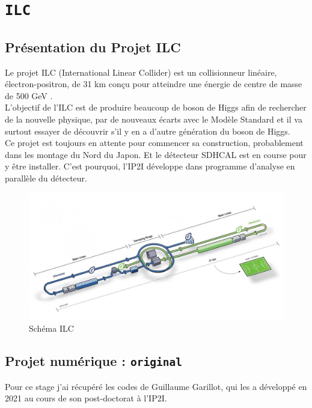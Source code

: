 \documentclass[10pt,a4paper]{report}
\newcommand{\MS}{Modèle Standard\xspace}
\newcommand{\original}{\texttt{original}\xspace}
\begin{document}

\chapter{\texttt{ILC}}

\section{Présentation du Projet ILC}

Le projet ILC (International Linear Collider) est un collisionneur linéaire, électron-positron, de 31 km conçu pour atteindre une énergie de centre de masse de 500 GeV \cite{cern:ilc}. \\

L'objectif de l'ILC est de produire beaucoup de boson de Higgs afin de rechercher de la nouvelle physique, par de nouveaux écarts avec le \MS et il va surtout essayer de découvrir s'il y en a d'autre génération du boson de Higgs. \\

Ce projet est toujours en attente pour commencer sa construction, probablement dans les montage du Nord du Japon. Et le détecteur SDHCAL est en course pour y être installer. C'est pourquoi, l'IP2I développe dans programme d'analyse en parallèle du détecteur.

\begin{figure}[h!]
	\center
	\includegraphics[width=\textwidth]{../img/ilc.jpg} 
	\caption{Schéma ILC\cite{cern:ilc}}
	\label{ilc:schema}
\end{figure}

\section{Projet numérique : \original}

Pour ce stage j'ai récupéré les codes de Guillaume Garillot, qui les a développé en 2021 au cours de son post-doctorat à l'IP2I. 
\end{document}
